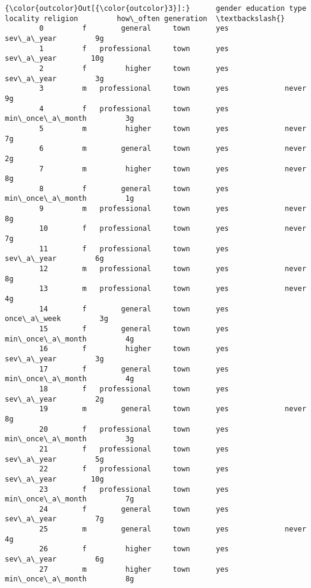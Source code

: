 \documentclass[11pt]{article}
\begin{document}
\begin{Verbatim}[commandchars=\\\{\}]
{\color{outcolor}Out[{\color{outcolor}3}]:}      gender education type locality religion         how\_often generation  \textbackslash{}
        0         f        general     town      yes        sev\_a\_year         9g   
        1         f   professional     town      yes        sev\_a\_year        10g   
        2         f         higher     town      yes        sev\_a\_year         3g   
        3         m   professional     town      yes             never         9g   
        4         f   professional     town      yes  min\_once\_a\_month         3g   
        5         m         higher     town      yes             never         7g   
        6         m        general     town      yes             never         2g   
        7         m         higher     town      yes             never         8g   
        8         f        general     town      yes  min\_once\_a\_month         1g   
        9         m   professional     town      yes             never         8g   
        10        f   professional     town      yes             never         7g   
        11        f   professional     town      yes        sev\_a\_year         6g   
        12        m   professional     town      yes             never         8g   
        13        m   professional     town      yes             never         4g   
        14        f        general     town      yes       once\_a\_week         3g   
        15        f        general     town      yes  min\_once\_a\_month         4g   
        16        f         higher     town      yes        sev\_a\_year         3g   
        17        f        general     town      yes  min\_once\_a\_month         4g   
        18        f   professional     town      yes        sev\_a\_year         2g   
        19        m        general     town      yes             never         8g   
        20        f   professional     town      yes  min\_once\_a\_month         3g   
        21        f   professional     town      yes        sev\_a\_year         5g   
        22        f   professional     town      yes        sev\_a\_year        10g   
        23        f   professional     town      yes  min\_once\_a\_month         7g   
        24        f        general     town      yes        sev\_a\_year         7g   
        25        m        general     town      yes             never         4g   
        26        f         higher     town      yes        sev\_a\_year         6g   
        27        m         higher     town      yes  min\_once\_a\_month         8g   

\end{Verbatim}
\end{document}
